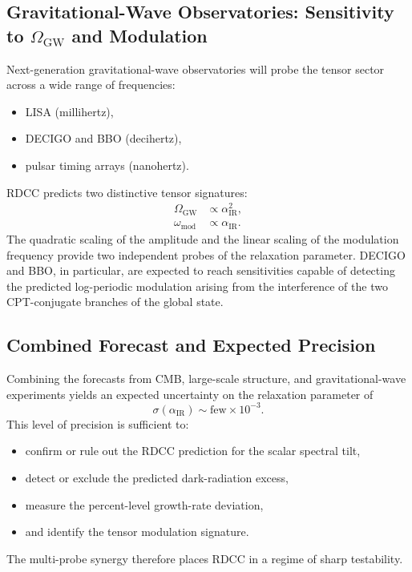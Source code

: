 \documentclass[11pt,a4paper]{article}
\begin{document}
\subsection{Gravitational-Wave Observatories: Sensitivity to \texorpdfstring{$\Omega_{\mathrm{GW}}$}{Omega GW} and Modulation}

Next-generation gravitational-wave observatories will probe the tensor sector across a wide
range of frequencies:
\begin{itemize}
    \item LISA (millihertz),
    \item DECIGO and BBO (decihertz),
    \item pulsar timing arrays (nanohertz).
\end{itemize}
RDCC predicts two distinctive tensor signatures:
\begin{align}
    \Omega_{\mathrm{GW}} &\propto \alpha_{\mathrm{IR}}^2, \\
    \omega_{\mathrm{mod}} &\propto \alpha_{\mathrm{IR}}.
\end{align}
The quadratic scaling of the amplitude and the linear scaling of the modulation frequency provide
two independent probes of the relaxation parameter. DECIGO and BBO, in particular, are
expected to reach sensitivities capable of detecting the predicted log-periodic modulation arising
from the interference of the two CPT-conjugate branches of the global state.

\subsection{Combined Forecast and Expected Precision}

Combining the forecasts from CMB, large-scale structure, and gravitational-wave experiments
yields an expected uncertainty on the relaxation parameter of
\begin{equation}
    \sigma(\alpha_{\mathrm{IR}}) \sim \text{few} \times 10^{-3}.
\end{equation}
This level of precision is sufficient to:
\begin{itemize}
    \item confirm or rule out the RDCC prediction for the scalar spectral tilt,
    \item detect or exclude the predicted dark-radiation excess,
    \item measure the percent-level growth-rate deviation,
    \item and identify the tensor modulation signature.
\end{itemize}
The multi-probe synergy therefore places RDCC in a regime of sharp testability.
\end{document}
